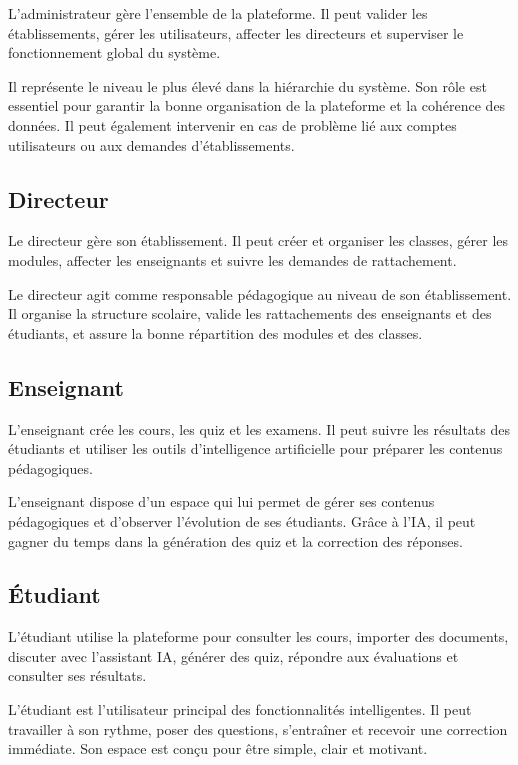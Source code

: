 \documentclass[12pt,a4paper]{report}
\begin{document}
L'administrateur gère l'ensemble de la plateforme. Il peut valider les établissements, gérer les utilisateurs, affecter les directeurs et superviser le fonctionnement global du système.

Il représente le niveau le plus élevé dans la hiérarchie du système. Son rôle
est essentiel pour garantir la bonne organisation de la plateforme et la
cohérence des données. Il peut également intervenir en cas de problème lié aux
comptes utilisateurs ou aux demandes d'établissements.

\subsection{Directeur}

Le directeur gère son établissement. Il peut créer et organiser les classes, gérer les modules, affecter les enseignants et suivre les demandes de rattachement.

Le directeur agit comme responsable pédagogique au niveau de son établissement.
Il organise la structure scolaire, valide les rattachements des enseignants et
des étudiants, et assure la bonne répartition des modules et des classes.

\subsection{Enseignant}

L'enseignant crée les cours, les quiz et les examens. Il peut suivre les résultats des étudiants et utiliser les outils d'intelligence artificielle pour préparer les contenus pédagogiques.

L'enseignant dispose d'un espace qui lui permet de gérer ses contenus
pédagogiques et d'observer l'évolution de ses étudiants. Grâce à l'IA, il peut
gagner du temps dans la génération des quiz et la correction des réponses.

\subsection{Étudiant}

L'étudiant utilise la plateforme pour consulter les cours, importer des documents, discuter avec l'assistant IA, générer des quiz, répondre aux évaluations et consulter ses résultats.

L'étudiant est l'utilisateur principal des fonctionnalités intelligentes. Il peut
travailler à son rythme, poser des questions, s'entraîner et recevoir une
correction immédiate. Son espace est conçu pour être simple, clair et motivant.
\end{document}
